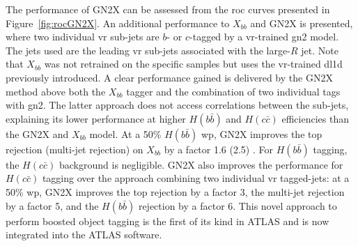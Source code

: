 The performance of GN2X can be assessed from the \gls{roc} curves presented in Figure~\ref{fig:rocGN2X}. An additional performance to $X_{bb}$ and GN2X is presented, where two individual \gls{vr} sub-jets are $b$- or $c$-tagged by a \gls{vr}-trained \gls{gn2} model. The jets used are the leading \gls{vr} sub-jets associated with the large-$R$ jet. Note that $X_{bb}$ was not retrained on the specific samples but uses the \gls{vr}-trained \gls{dl1d} previously introduced. A clear performance gained is delivered by the GN2X method above both the $X_{bb}$ tagger and the combination of two individual tags with \gls{gn2}. The latter approach does not access correlations between the sub-jets, explaining its lower performance at higher $H(b\bar{b})$ and $H(c\bar{c})$ efficiencies than the GN2X and $X_{bb}$ model. At a 50\% $H(b\bar{b})$ \gls{wp}, GN2X improves the top rejection (multi-jet rejection) on $X_{bb}$ by a factor 1.6 (2.5) \cite{ATL-PHYS-PUB-2023-021}. For $H(b\bar{b})$ tagging, the $H(c\bar{c})$ background is negligible. GN2X also improves the performance for $H(c\bar{c})$ tagging over the approach combining two individual \gls{vr} tagged-jets: at a 50\% \gls{wp}, GN2X improves the top rejection by a factor 3, the multi-jet rejection by a factor 5, and the $H(b\bar{b})$ rejection by a factor 6. This novel approach to perform boosted object tagging is the first of its kind in ATLAS and is now integrated into the ATLAS software.

